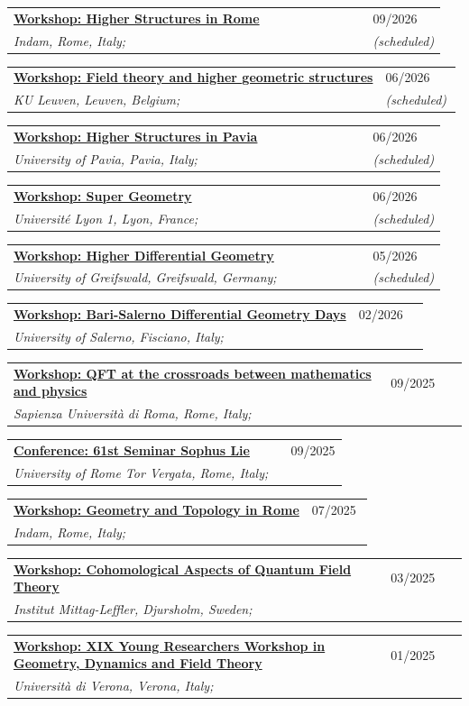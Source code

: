 \documentclass[a4paper]{article}
\newcommand{\longvoice}[8]{
	\begin{tabular}{p{0.83\linewidth} p{0.17\linewidth} }
		\textbf{\href{#3}{#2: #1}} & #4 
		\\ 
		\textit{#5, #6, #7;} & {\small\emph{#8}}
	\end{tabular}
	\vspace{.5em}
}
\begin{document}
    \longvoice{Higher Structures in Rome}
        {Workshop}
        {https://www.mat.uniroma2.it/~kowalzig/operads/op.html}
        {09/2026}
        {Indam}
        {Rome}
        {Italy}
        {(scheduled)}
    \longvoice{Field theory and higher geometric structures}
        {Workshop}
        {https://wis.kuleuven.be/events/2026_poisson/workshop_field_theory}
        {06/2026}
        {KU Leuven}
        {Leuven}
        {Belgium}
        {(scheduled)}
    \longvoice{Higher Structures in Pavia}
        {Workshop}
        {http://wpage.unina.it/francesco.dandrea/Pavia2026/index.html}
        {06/2026}
        {University of Pavia}
        {Pavia}
        {Italy}
        {(scheduled)}
    \longvoice{Super Geometry}
        {Workshop}
        {https://ryvkin.eu/conferences/sg2026/}
        {06/2026}
        {Université Lyon 1}
        {Lyon}
        {France}
        {(scheduled)}
    \longvoice{Higher Differential Geometry}
        {Workshop}
        {https://www.wiko-greifswald.de/en/registrations/higher-differential-geometry}
        {05/2026}
        {University of Greifswald}
        {Greifswald}
        {Germany}
        {(scheduled)}
    \longvoice{Bari-Salerno Differential Geometry Days}
        {Workshop}
        {https://www.dipmat2.unisa.it/people/vitagliano/www/workshop_BA-SA.html}
        {02/2026}
        {University of Salerno}
        {Fisciano}
        {Italy}
        {}
    \longvoice{QFT at the crossroads between mathematics and physics}
        {Workshop}
        {https://sites.google.com/view/qft-at-the-crossroads/home?authuser=0}
        {09/2025}
        {Sapienza Università di Roma}
        {Rome}
        {Italy}
        {}
    \longvoice{61st Seminar Sophus Lie}
        {Conference}
        {https://sites.google.com/view/slw61/home-page?authuser=0}
        {09/2025}
        {University of Rome Tor Vergata}
        {Rome}
        {Italy}
        {}
    \longvoice{Geometry and Topology in Rome}
        {Workshop}
        {https://www.mat.uniroma2.it/~kowalzig/ws.html}
        {07/2025}
        {Indam}
        {Rome}
        {Italy}
        {}	
	\longvoice{Cohomological Aspects of Quantum Field Theory}
		{Workshop}
		{https://www.mittag-leffler.se/activities/cohomological-aspects-of-quantum-field-theory/}
		{03/2025}
		{Institut Mittag-Leffler}
		{Djursholm}
		{Sweden}
		{}
	\longvoice{XIX Young Researchers Workshop in Geometry, Dynamics and Field Theory}
		{Workshop}
		{https://sites.google.com/view/xix-yrw-verona/program?authuser=0}
		{01/2025}
		{Università di Verona}
		{Verona}
		{Italy}
		{}
\end{document}
